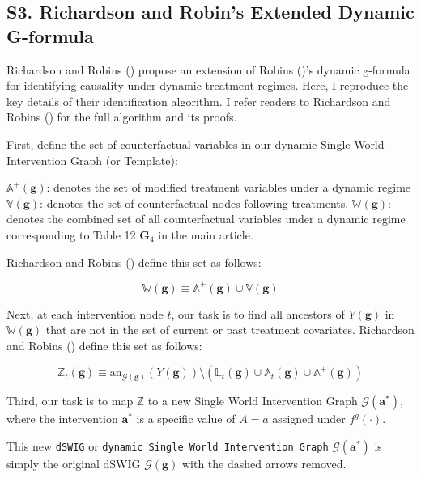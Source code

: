\documentclass[
  single column]{article}
\begin{document}
\newpage{}

\subsection{S3. Richardson and Robin's Extended Dynamic
G-formula}\label{id-app-c}

Richardson and Robins () propose an
extension of Robins ()'s dynamic
g-formula for identifying causality under dynamic treatment regimes.
Here, I reproduce the key details of their identification algorithm. I
refer readers to Richardson and Robins
() for the full algorithm and its
proofs.

First, define the set of counterfactual variables in our dynamic Single
World Intervention Graph (or Template):

\(\mathbb{A}^+(\mathbf{g})\): denotes the set of modified treatment
variables under a dynamic regime \(\mathbb{V}(\mathbf{g})\): denotes the
set of counterfactual nodes following treatments.
\(\mathbb{W}(\mathbf{g})\): denotes the combined set of all
counterfactual variables under a dynamic regime corresponding to Table
12 \(\mathbf{G}_4\) in the main article.

Richardson and Robins () define this
set as follows:

\[
\mathbb{W}(\mathbf{g}) \equiv \mathbb{A}^+(\mathbf{g}) \cup \mathbb{V}(\mathbf{g})
\]

Next, at each intervention node \(t\), our task is to find all ancestors
of \(Y(\mathbf{g})\) in \(\mathbb{W}(\mathbf{g})\) that are not in the
set of current or past treatment covariates. Richardson and Robins
() define this set as follows:

\[
\mathbb{Z}_t(\mathbf{g}) \equiv \text{an}_{\mathcal{G}(\mathbf{g})}(Y(\mathbf{g})) \setminus (\mathbb{L}_t(\mathbf{g}) \cup \mathbb{A}_t(\mathbf{g}) \cup \mathbb{A}^+(\mathbf{g}))
\]

Third, our task is to map \(\mathbb{Z}\) to a new Single World
Intervention Graph \(\mathcal{G}(\mathbf{a}^*)\), where the intervention
\(\mathbf{a}^*\) is a specific value of \(A = a\) assigned under
\(f^g(\cdot)\).

This new \texttt{dSWIG} or
\texttt{dynamic\ Single\ World\ Intervention\ Graph}
\(\mathcal{G}(\mathbf{a}^*)\) is simply the original dSWIG
\(\mathcal{G}(\mathbf{g})\) with the dashed arrows removed.
\end{document}
